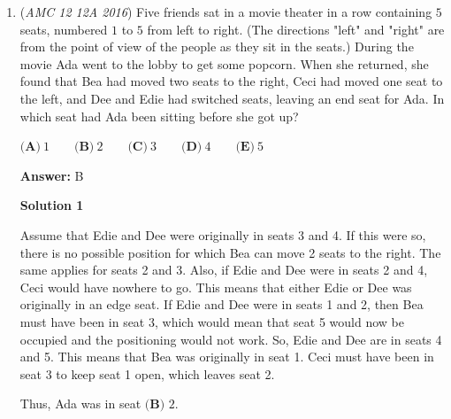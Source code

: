 \begin{enumerate}
\textbf{Solution}

Let $s$ be the side length of the small squares.

 The diagonal of the big square can be written in two ways: $\sqrt{2}$ and $s \sqrt{2} + s + s \sqrt{2}$.

 Solving for $s$, we get $s = \frac{4 - \sqrt{2}}{7}$, so our answer is $4 + 7 \Rightarrow \boxed{\textbf{(E) } 11}$




\textbf{Solution 2}

The diagonal of the small square can be written in two ways: $s \sqrt(2)$ and $2*(1-2s).$ Equating and simplifying gives $s = \frac{4 - \sqrt{2}}{7}$. Hence our answer is $4 + 7 \Rightarrow \boxed{\textbf{(E) } 11}.$



	\item (\textit{AMC 12 12A 2016}) Five friends sat in a movie theater in a row containing $5$ seats, numbered $1$ to $5$ from left to right. (The directions "left" and "right" are from the point of view of the people as they sit in the seats.) During the movie Ada went to the lobby to get some popcorn. When she returned, she found that Bea had moved two seats to the right, Ceci had moved one seat to the left, and Dee and Edie had switched seats, leaving an end seat for Ada. In which seat had Ada been sitting before she got up?


 $\textbf{(A)}\ 1\qquad\textbf{(B)}\ 2\qquad\textbf{(C)}\ 3\qquad\textbf{(D)}\ 4\qquad\textbf{(E)}\ 5$

 \textbf{Answer: }B



\textbf{Solution 1}

Assume that Edie and Dee were originally in seats 3 and 4. If this were so, there is no possible position for which Bea can move 2 seats to the right. The same applies for seats 2 and 3. Also, if Edie and Dee were in seats 2 and 4, Ceci would have nowhere to go. This means that either Edie or Dee was originally in an edge seat. If Edie and Dee were in seats 1 and 2, then Bea must have been in seat 3, which would mean that seat 5 would now be occupied and the positioning would not work. So, Edie and Dee are in seats 4 and 5. This means that Bea was originally in seat 1. Ceci must have been in seat 3 to keep seat 1 open, which leaves seat 2.

 Thus, Ada was in seat $\boxed{\textbf{(B) }2}$.

 




\end{enumerate}
